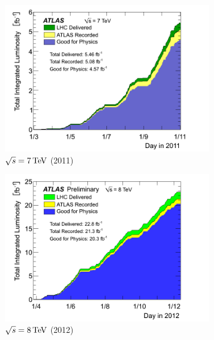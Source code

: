 \begin{figure}[h!]
   \begin{subfigure}[t]{0.5\textwidth}
        \centering
        \includegraphics[width=\textwidth]{figures/ATLAS_lumi_2011}
        \caption{$\sqrt{s} = 7 \TeV$ (2011)}
    \end{subfigure}%
    \begin{subfigure}[t]{0.5\textwidth}
        \centering
        \includegraphics[width=\textwidth]{figures/ATLAS_lumi_2012}
        \caption{$\sqrt{s} = 8 \TeV$ (2012)}
    \end{subfigure}
    \begin{subfigure}[t]{0.5\textwidth}
        \centering

\end{subfigure}
\end{figure}
